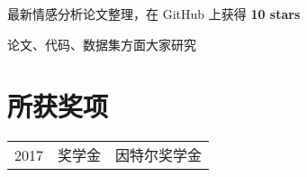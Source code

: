 \documentclass[]{deedy-resume-openfont}
\begin{document}
\begin{minipage}[t]{0.68\textwidth} 




\begin{tightemize}
    \item 最新情感分析论文整理，在 GitHub 上获得 \textbf{10 stars}
    \item 论文、代码、数据集方面大家研究
    \end{tightemize}
\sectionsep


% 
% 



\section{所获奖项} 
\begin{tabular}{rll}
2017         & 奖学金  & 因特尔奖学金 \\

\end{tabular}
\sectionsep




\end{minipage}
\end{document}
